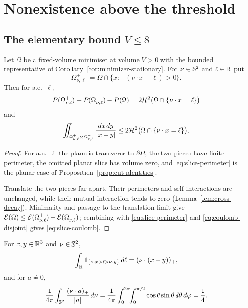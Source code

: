 \chapter{Nonexistence above the threshold}\label{ch:nonexistence}

\section{The elementary bound $V\le8$}

\begin{lemma}\label{lem:slicing-inequality}
Let $\Omega$ be a fixed-volume minimiser at volume $V>0$ with the bounded
representative of Corollary~\ref{cor:minimizer-stationary}.  For
$\nu\in\mathbb S^2$ and $\ell\in\mathbb R$ put
\[
  \Omega^\pm_{\nu,\ell}:=\Omega\cap\{x:\pm(\nu\cdot x-\ell)>0\} .
\]
Then for a.e.\ $\ell$,
\begin{equation}\label{eq:slice-perimeter}
  P(\Omega^+_{\nu,\ell})+P(\Omega^-_{\nu,\ell})-P(\Omega)
  =2\mathcal H^2\bigl(\Omega\cap\{\nu\cdot x=\ell\}\bigr)
\end{equation}
and
\begin{equation}\label{eq:slice-coulomb}
  \iint_{\Omega^+_{\nu,\ell}\times\Omega^-_{\nu,\ell}}\frac{dx\,dy}{|x-y|}
  \le2\mathcal H^2\bigl(\Omega\cap\{\nu\cdot x=\ell\}\bigr).
\end{equation}
\end{lemma}

\begin{proof}
For a.e.\ $\ell$ the plane is transverse to $\partial\Omega$, the two pieces
have finite perimeter, the omitted planar slice has volume zero, and
\eqref{eq:slice-perimeter} is the planar case of
Proposition~\ref{prop:cut-identities}.

Translate the two pieces far apart.  Their perimeters and self-interactions are
unchanged, while their mutual interaction tends to zero
(Lemma~\ref{lem:cross-decay}).  Minimality and passage to the translation limit
give
$\mathcal E(\Omega)\le\mathcal E(\Omega^+_{\nu,\ell})+\mathcal E(\Omega^-_{\nu,\ell})$; combining
with \eqref{eq:slice-perimeter} and \eqref{eq:coulomb-disjoint} gives
\eqref{eq:slice-coulomb}.
\end{proof}

\begin{lemma}\label{lem:slicing-integrals}
For $x,y\in\mathbb R^3$ and $\nu\in\mathbb S^2$,
\begin{equation}\label{eq:slice-ell-integral}
  \int_\mathbb R\mathbf 1_{\{\nu\cdot x>\ell>\nu\cdot y\}}\,d\ell=(\nu\cdot(x-y))_+ ,
\end{equation}
and for $a\ne0$,
\begin{equation}\label{eq:slice-sphere-average}
  \frac1{4\pi}\int_{\mathbb S^2}\frac{(\nu\cdot a)_+}{|a|}\,d\nu
  =\frac1{4\pi}\int_0^{2\pi}\!\!\int_0^{\pi/2}\cos\theta\sin\theta\,d\theta\,d\varphi
  =\frac14 .
\end{equation}
\end{lemma}

